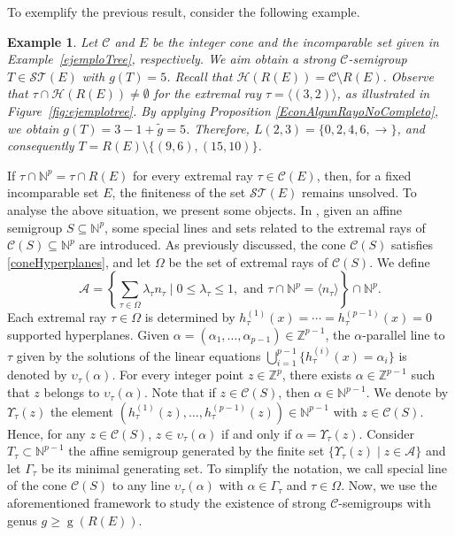 \documentclass[a4paper,11pt]{article}
\newtheorem{example}[theorem]{Example}
\def\CaH{\mathcal{H}}
\def\CaC{\mathcal{C}}
\def\CaA{\mathcal{A}}
\def\N{\mathbb{N}}
\def\Z{\mathbb{Z}}
\def\g{\operatorname{g}}
\begin{document}
{To exemplify the previous result, consider the following example.

\begin{example}
Let $\CaC$ and $E$ be the integer cone and the incomparable set given in Example~\ref{ejemploTree}, respectively. We aim obtain a strong $\CaC$-semigroup $T \in\mathcal{ST}(E)$ with $g(T)=5$.
Recall that $\CaH(R(E))=\CaC\setminus R(E)$. Observe that $\tau \cap \CaH(R(E)) \neq \emptyset$ for the extremal ray $\tau=\langle(3,2)\rangle$, as illustrated in Figure~\ref{fig:ejemplotree}. By applying Proposition \ref{EconAlgunRayoNoCompleto}, we obtain $g(T)=3-1+\tilde{g}=5$. Therefore, $L(2,3)=\{0,2,4,6,\to\}$, and consequently $T=R(E)\setminus\{(9,6),(15,10)\}$.
\end{example}

If $\tau \cap \N^p = \tau \cap R(E)$ for every extremal ray $\tau \in \CaC(E)$, then, for a fixed incomparable set $E$, the finiteness of the set $\mathcal{ST}(E)$ remains unsolved. To analyse the above situation, we present some objects.
In \cite{check_C_semigr}, given an affine semigroup $S\subseteq \N^p$, some special lines and sets related to the extremal rays of $\CaC(S)\subseteq \N^p$ are introduced. As previously discussed, the cone $\CaC(S)$ satisfies \eqref{coneHyperplanes}, and let $\Omega$ be the set of extremal rays of $\CaC(S)$. We define
\[
\CaA=\left\{ \sum_{\tau\in \Omega} \lambda_\tau n_\tau \mid 0\le \lambda_\tau\le 1,\mbox{ and } \tau\cap \N^p = \langle n_\tau\rangle \right\}\cap \N^p.
\]
Each extremal ray $\tau\in \Omega$ is determined by $h_\tau^{(1)}(x)=\cdots =h_\tau^{(p-1)}(x)=0$ supported hyperplanes.
Given $\alpha=(\alpha_1, \ldots, \alpha_{p-1})\in \Z^{p-1}$, the $\alpha$-parallel line to $\tau$ given by the solutions of the linear equations $\bigcup _{i=1}^{p-1} \{h_\tau^{(i)}(x)=\alpha_i\}$ is denoted by $\upsilon_{\tau}(\alpha)$. For every integer point $z\in \Z^p$, there exists $\alpha \in \Z^{p-1}$ such that $z$ belongs to $\upsilon_{\tau}(\alpha)$. Note that if $z\in \CaC(S)$, then $\alpha \in \N^{p-1}$. We denote by $\Upsilon _\tau(z)$ the element $(h_\tau^{(1)}(z),\ldots ,h_\tau^{(p-1)}(z))\in\N^{p-1}$ with $z\in\CaC (S)$. Hence, for any $z\in\CaC (S)$, $z\in \upsilon_\tau(\alpha)$ if and only if $\alpha =\Upsilon_\tau(z)$. Consider
$ T_\tau\subset\N^{p-1}$ the affine semigroup generated by the finite set $\{\Upsilon_\tau(z)\mid z\in \CaA\}$ and let $\Gamma_\tau$ be its minimal generating set.
To simplify the notation, we call special line of the cone $\CaC(S)$ to any line $\upsilon_\tau(\alpha)$ with $\alpha \in \Gamma_\tau$ and $\tau \in \Omega$.
Now, we use the aforementioned framework to study the existence of strong $\CaC$-semigroups with genus $g \geq \g(R(E))$.

}
\end{document}
